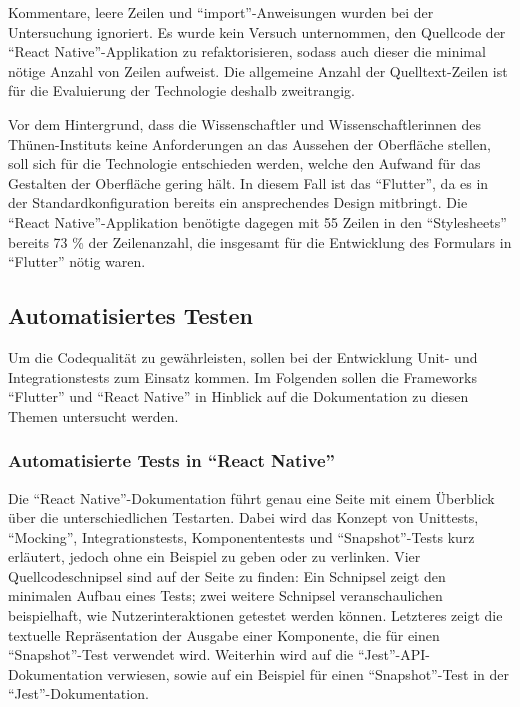 Kommentare, leere Zeilen und \enquote{import}-Anweisungen wurden bei der Untersuchung ignoriert.
Es wurde kein Versuch unternommen,
den Quellcode der \enquote{React Native}-Applikation zu refaktorisieren,
sodass auch dieser die minimal nötige Anzahl von Zeilen aufweist.
Die allgemeine Anzahl der Quelltext-Zeilen ist für die Evaluierung der Technologie deshalb zweitrangig. 

Vor dem Hintergrund,
dass die Wissenschaftler und Wissenschaftlerinnen des Thünen-Instituts keine Anforderungen an das Aussehen der Oberfläche stellen,
soll sich für die Technologie entschieden werden,
welche den Aufwand für das Gestalten der Oberfläche gering hält.
In diesem Fall ist das \enquote{Flutter},
da es in der Standardkonfiguration bereits ein ansprechendes Design mitbringt.
Die \enquote{React Native}-Applikation benötigte dagegen mit 55 Zeilen in den \enquote{Stylesheets} bereits 73 \% der Zeilenanzahl,
die insgesamt für die Entwicklung des Formulars in \enquote{Flutter} nötig waren. 

 


\subsection{Automatisiertes Testen}

Um die Codequalität zu gewährleisten,
sollen bei der Entwicklung Unit- und Integrationstests zum Einsatz kommen.
Im Folgenden sollen die Frameworks \enquote{Flutter} und \enquote{React Native} in Hinblick auf die Dokumentation zu diesen Themen untersucht werden. 

\subsubsection{Automatisierte Tests in \enquote{React Native}} Die \enquote{React Native}-Dokumentation führt genau eine Seite mit einem Überblick über die unterschiedlichen Testarten.
Dabei wird das Konzept von Unittests, \enquote{Mocking}, Integrationstests, Komponententests und \enquote{Snapshot}-Tests kurz erläutert, jedoch ohne ein Beispiel zu geben oder zu verlinken.
Vier Quellcodeschnipsel sind auf der Seite zu finden: Ein Schnipsel zeigt den minimalen Aufbau eines Tests; zwei weitere Schnipsel veranschaulichen beispielhaft, wie Nutzerinteraktionen getestet werden können.
Letzteres zeigt die textuelle Repräsentation der Ausgabe einer Komponente, die für einen \enquote{Snapshot}-Test verwendet wird.
Weiterhin wird auf die \enquote{Jest}-API-Dokumentation verwiesen, sowie auf ein Beispiel für einen \enquote{Snapshot}-Test in der \enquote{Jest}-Dokumentation.

